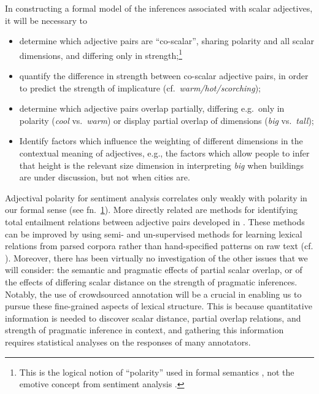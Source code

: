 \documentclass[10pt]{article}
\begin{document}
In constructing a formal model of the inferences associated with scalar adjectives, it will be necessary to 
 \vspace{-.25in}
\begin{itemize}
\item [1.] determine which adjective pairs are ``co-scalar'', sharing polarity and all scalar dimensions, and differing only in strength;\footnote{\label{polarity}This is the logical notion of ``polarity'' used in formal semantics \cite{kennedy2001polar}, not the emotive concept from sentiment analysis  \cite{wilson2009recognizing}.}
\item [2.]quantify the difference in strength between co-scalar adjective pairs, in order to predict the strength of implicature (cf.\ \emph{warm/hot/scorching});
\item [3.]determine which adjective pairs overlap partially, differing e.g.\ only in polarity (\emph{cool} vs.\ \emph{warm}) or display partial overlap of dimensions (\emph{big} vs.\ \emph{tall});
\item [4.] Identify factors which influence the weighting of different dimensions in the contextual meaning of adjectives, e.g., the factors which allow people to infer that height is the relevant size dimension in interpreting \emph{big} when buildings are under discussion, but not when cities are.
\end{itemize}
 \vspace{-.05in}

Adjectival polarity for sentiment analysis \cite{williams2009predicting}
correlates only weakly with polarity in our formal sense (see fn.\ \ref{polarity}). More directly related are methods for identifying total entailment relations between adjective pairs developed in \cite{sheinman2009adjscales,sheinmanetal2013}. 
These methods can be improved 
by using semi- and un-supervised methods for learning lexical relations from parsed corpora rather than hand-specified patterns on raw text (cf. \cite{snow04,davidov2008unsupervised,turney2008uniform}). Moreover, there has been virtually no investigation of the other issues that we will consider: the semantic and pragmatic effects of partial scalar overlap, or of the effects of differing scalar distance on the strength of pragmatic inferences. Notably, the use of crowdsourced annotation will be a crucial in enabling us to pursue these fine-grained aspects of lexical structure. This is because quantitative information is needed to discover scalar distance, partial overlap relations, and strength of pragmatic inference in context, and gathering this information requires statistical analyses on the responses of many annotators.
\end{document}
